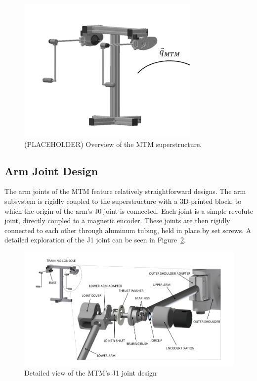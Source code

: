 \begin{figure}[htb!] %
    \centering
    \includegraphics[width=1.0\linewidth]{figures/superstructure.png} %
    \caption{(PLACEHOLDER) Overview of the MTM superstructure.}
    \label{fig:superstructure}
\end{figure}

\subsection{Arm Joint Design}

The arm joints of the MTM feature relatively straightforward designs. The arm subsystem is rigidly coupled to the superstructure with a 3D-printed block, to which the origin of the arm's J0 joint is connected. Each joint is a simple revolute joint, directly coupled to a magnetic encoder. These joints are then rigidly connected to each other through aluminum tubing, held in place by set screws. A detailed exploration of the J1 joint can be seen in Figure~\ref{fig:J1_detailed}. 

\begin{figure}[H] 
    \centering
    \includegraphics[width=1.00\linewidth]{figures/J1_detailed.png} 
    \caption{Detailed view of the MTM's J1 joint design \cite{walder2022design}} 
    \label{fig:J1_detailed} 
\end{figure}


